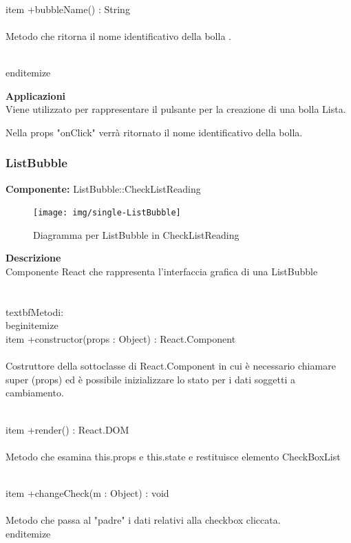 \\item +bubbleName() : String 
\\\\
Metodo che ritorna il nome identificativo della bolla .

\\end{itemize} 


\textbf{Applicazioni}\\
Viene utilizzato per rappresentare il pulsante per la creazione di una bolla Lista.

Nella props "onClick" verrà ritornato il nome identificativo della bolla. 


\clearpage

\subsubsection{ListBubble}
\textbf{Componente:}  ListBubble::CheckListReading\\
   \FloatBarrier
   \begin{figure}[ht]
   \centering
   \texttt{[image: img/single-ListBubble]}
   \caption{{Diagramma per ListBubble in CheckListReading}}
\end{figure}
\FloatBarrier
\textbf{Descrizione}\\
Componente React che rappresenta l'interfaccia grafica di una ListBubble
\\\\
\\textbf{Metodi:} 
\\begin{itemize}
\\item +constructor(props : Object) : React.Component 
\\\\
Costruttore della sottoclasse di React.Component in cui è necessario chiamare super (props) ed è possibile inizializzare lo stato per i dati soggetti a cambiamento.

\\item +render() : React.DOM 
\\\\
Metodo che esamina this.props e this.state e restituisce elemento CheckBoxList 

\\item +changeCheck(m : Object) : void \\\\
Metodo che passa al "padre" i dati relativi alla checkbox cliccata.
\\end{itemize} 


